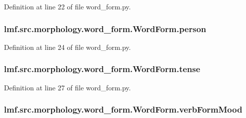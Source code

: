 Definition at line 22 of file word\+\_\+form.\+py.

\hypertarget{classlmf_1_1src_1_1morphology_1_1word__form_1_1_word_form_a982fc33af45a08aa5a039dc4701c3689}{
\subsubsection[{person}]{\setlength{\rightskip}{0pt plus 5cm}lmf.\+src.\+morphology.\+word\+\_\+form.\+Word\+Form.\+person}}\label{classlmf_1_1src_1_1morphology_1_1word__form_1_1_word_form_a982fc33af45a08aa5a039dc4701c3689}


Definition at line 24 of file word\+\_\+form.\+py.

\hypertarget{classlmf_1_1src_1_1morphology_1_1word__form_1_1_word_form_aaf6dd6658e2e9014ea0490d0edb6cec8}{
\subsubsection[{tense}]{\setlength{\rightskip}{0pt plus 5cm}lmf.\+src.\+morphology.\+word\+\_\+form.\+Word\+Form.\+tense}}\label{classlmf_1_1src_1_1morphology_1_1word__form_1_1_word_form_aaf6dd6658e2e9014ea0490d0edb6cec8}


Definition at line 27 of file word\+\_\+form.\+py.

\hypertarget{classlmf_1_1src_1_1morphology_1_1word__form_1_1_word_form_a47aea97a4bbd8cca9624b0143f639716}{
\subsubsection[{verb\+Form\+Mood}]{\setlength{\rightskip}{0pt plus 5cm}lmf.\+src.\+morphology.\+word\+\_\+form.\+Word\+Form.\+verb\+Form\+Mood}}\label{classlmf_1_1src_1_1morphology_1_1word__form_1_1_word_form_a47aea97a4bbd8cca9624b0143f639716}


